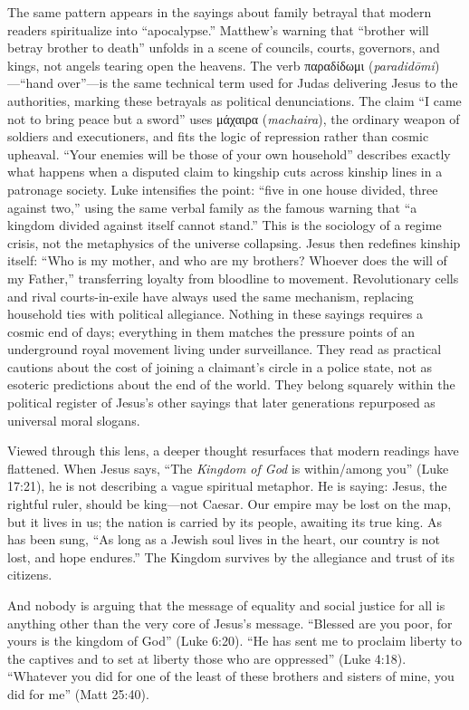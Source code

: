 The same pattern appears in the sayings about family betrayal that modern readers spiritualize into ``apocalypse.''
Matthew's warning that ``brother will betray brother to death'' unfolds in a scene of councils, courts, governors, and kings, not angels tearing open the heavens.
The verb παραδίδωμι (\textit{paradidōmi})---``hand over''---is the same technical term used for Judas delivering Jesus to the authorities, marking these betrayals as political denunciations.
The claim ``I came not to bring peace but a sword'' uses μάχαιρα (\textit{machaira}), the ordinary weapon of soldiers and executioners, and fits the logic of repression rather than cosmic upheaval.
``Your enemies will be those of your own household'' describes exactly what happens when a disputed claim to kingship cuts across kinship lines in a patronage society.
Luke intensifies the point: ``five in one house divided, three against two,'' using the same verbal family as the famous warning that ``a kingdom divided against itself cannot stand.''
This is the sociology of a regime crisis, not the metaphysics of the universe collapsing.
Jesus then redefines kinship itself: ``Who is my mother, and who are my brothers? Whoever does the will of my Father,'' transferring loyalty from bloodline to movement.
Revolutionary cells and rival courts-in-exile have always used the same mechanism, replacing household ties with political allegiance.
Nothing in these sayings requires a cosmic end of days; everything in them matches the pressure points of an underground royal movement living under surveillance.
They read as practical cautions about the cost of joining a claimant's circle in a police state, not as esoteric predictions about the end of the world.
They belong squarely within the political register of Jesus's other sayings that later generations repurposed as universal moral slogans.

Viewed through this lens, a deeper thought resurfaces that modern readings have flattened.
When Jesus says, ``The \emph{Kingdom of God} is within/among you'' (Luke 17:21), he is not describing a vague spiritual metaphor.
He is saying: Jesus, the rightful ruler, should be king---not Caesar. Our empire may be lost on the map, but it lives in us; the nation is carried by its people, awaiting its true king.
As has been sung, ``As long as a Jewish soul lives in the heart, our country is not lost, and hope endures.''
The Kingdom survives by the allegiance and trust of its citizens.

And nobody is arguing that the message of equality and social justice for all is anything other than the very core of Jesus's message.
“Blessed are you poor, for yours is the kingdom of God” (Luke 6:20).
“He has sent me to proclaim liberty to the captives and to set at liberty those who are oppressed” (Luke 4:18).
“Whatever you did for one of the least of these brothers and sisters of mine, you did for me” (Matt 25:40).


